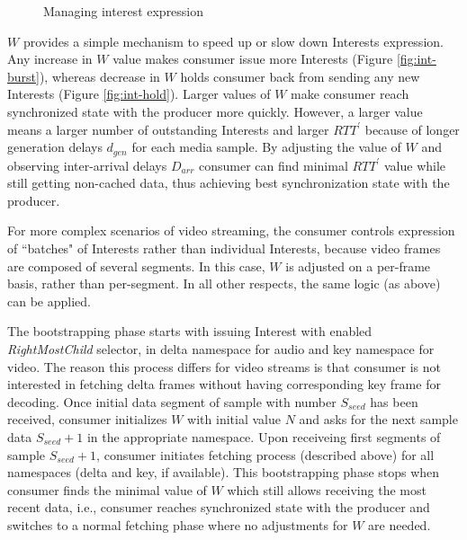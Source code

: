 \documentclass{icn/sig-alternate-2012} %
\begin{document}
\begin{figure}[t!]
\centering


\caption{Managing interest expression}
\label{fig:w-concept}
\end{figure}


$W$ provides a simple mechanism to speed up or slow down Interests expression. Any increase in $W$ value makes consumer issue more Interests (Figure \ref{fig:int-burst}), whereas decrease in $W$ holds consumer back from sending any new Interests (Figure \ref{fig:int-hold}). Larger values of $W$ make consumer reach synchronized state with the producer more quickly. However, a larger value means a larger number of outstanding Interests and larger $RTT^\prime$ because of longer generation delays $d_{gen}$ for each media sample. By adjusting the value of $W$ and observing inter-arrival delays $D_{arr}$ consumer can find minimal $RTT^\prime$ value while still getting non-cached data, thus achieving best synchronization state with the producer.

For more complex scenarios of video streaming, the consumer controls expression of ``batches" of Interests rather than individual Interests, because video frames are composed of several segments. In this case, $W$ is adjusted on a per-frame basis, rather than per-segment. In all other respects, the same logic (as above) can be applied.

The bootstrapping phase starts with issuing Interest with enabled \textit{RightMostChild} selector, in delta namespace for audio and key namespace for video. The reason this process differs for video streams is that consumer is not interested in fetching delta frames without having corresponding key frame for decoding. Once initial data segment of sample with number $S_{seed}$ has been received, consumer initializes $W$ with initial value $N$ and asks for the next sample data $S_{seed}+1$ in the appropriate namespace. Upon receiveing first segments of sample $S_{seed}+1$, consumer initiates fetching process (described above) for all namespaces (delta and key, if available). This bootstrapping phase stops when consumer finds the minimal value of $W$ which still allows receiving the most recent data, i.e., consumer reaches synchronized state with the producer and switches to a normal fetching phase where no adjustments for $W$ are needed. 
\end{document}
